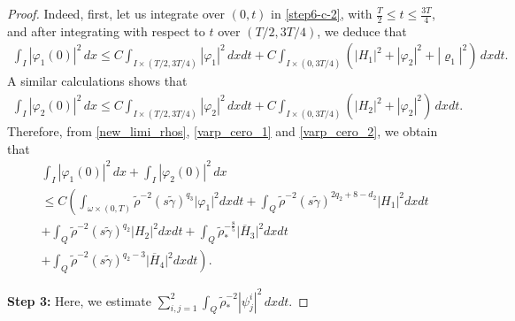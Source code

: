 \documentclass[11pt,a4paper]{amsart}
\numberwithin{equation}{section}
\begin{document}
\begin{proof}
 \noindent Indeed, first, let us integrate  over $(0,t)$  in \eqref{step6-c-2},  with   $\frac{T}{2}\leq t \leq \frac{3T}{4}$, and  after integrating  with respect to $t$  over $(T/2,3T/4)$, we deduce  that 
 \begin{align}\label{varp_cero_1}
 \int_{I}|\varphi_{1}(0)|^{2}\,dx  \leq C \int_{I\times(T/2,3T/4)}|\varphi_1|^{2}\,dxdt+C\int_{I\times(0,3T/4)}(|H_{1}|^{2} +  |\varphi_2|^{2}+|\varrho_1|^{2})\,dxdt.    
 \end{align}A similar calculations shows that
 \begin{align}\label{varp_cero_2}
 \int_{I}|\varphi_{2}(0)|^{2}\,dx \leq C \int_{I\times(T/2,3T/4)}|\varphi_2|^{2}\,dxdt+C\int_{I\times(0,3T/4)}(|H_{2}|^{2} +  |\varphi_2|^{2})\,dxdt.    
 \end{align}Therefore, from \eqref{new_limi_rhos}, \eqref{varp_cero_1} and \eqref{varp_cero_2}, we obtain that
 \begin{equation}\label{step6-c-7}
  \begin{split}
& \int_{I}|\varphi_{1}(0)|^{2}\,dx+\int_{I}|\varphi_{2}(0)|^{2}\,dx\\
&\leq C\left(\int_{\omega\times (0,T)}\tilde{\rho}^{-2}(s\tilde{\gamma})^{q_3}\vert \varphi_1 \vert^2dxdt +\int_{Q}\tilde{\rho}^{-2}(s\tilde{\gamma})^{2q_{2}+8-d_{2}}\vert H_1\vert^2dxdt \right.\\
&	  + \int_{Q}\tilde{\rho}^{-2}(s\tilde{\gamma})^{q_2}\vert H_2\vert^2dxdt+ \int_{Q}\tilde{\rho}^{-\frac{8}{5}}_{*} \vert \overline{H}_3\vert^2  dxdt\\
& \left.  +\int_{Q}\tilde{\rho}^{-2}(s\tilde{\gamma})^{q_2-3} \vert \overline{H}_4\vert^2  dxdt \right).
  \end{split}   
 \end{equation}

 \textbf{Step 3:} Here, we estimate $\displaystyle \sum_{i,j=1}^{2}\int_{Q}\tilde{\rho}^{-2}_{*}|\psi^{i}_{j}|^{2}\,dxdt$.


\end{proof}
\end{document}
